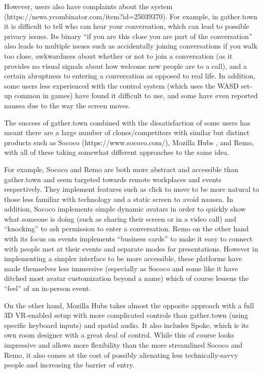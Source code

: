 \documentclass[bsc,frontabs,singlespacing,parskip,deptreport]{infthesis}
\begin{document}
However, users also have complaints about the system (https://news.ycombinator.com/item?id=25039370).  For example, in gather.town it is difficult to tell who can hear your conversation, which can lead to possible privacy issues.  Its binary “if you are this close you are part of the conversation” also leads to multiple issues such as accidentally joining conversations if you walk too close, awkwardness about whether or not to join a conversation (as it provides no visual signals about how welcome new people are to a call), and  a certain abruptness to entering a conversation as opposed to real life.  In addition, some users less experienced with the control system (which uses the WASD set-up common in games) have found it difficult to use, and some have even reported nausea due to the way the screen moves.

The success of gather.town combined with the dissatisfaction of some users has meant there are a large number of clones/competitors with similar but distinct products such as Sococo (https://www.sococo.com/), Mozilla Hubs , and Remo, with all of these taking somewhat different approaches to the same idea.

For example, Sococo and Remo are both more abstract and accessible than gather.town and seem targeted towards remote workplaces and events respectively.  They implement features such as click to move to be more natural to those less familiar with technology and a static screen to avoid nausea.  In addition, Sococo implements simple dynamic avatars in order to quickly show what someone is doing (such as sharing their screen or in a video call) and “knocking” to ask permission to enter a conversation.  Remo on the other hand with its focus on events implements “business cards” to make it easy to connect with people met at their events and separate modes for presentations.  However in implementing a simpler interface to be more accessible, these platforms have made themselves less immersive (especially as Sococo and some like it have ditched most avatar customization beyond a name) which of course lessens the “feel” of an in-person event.

On the other hand, Mozilla Hubs takes almost the opposite approach with a full 3D VR-enabled setup with more complicated controls than gather.town (using specific keyboard inputs) and spatial audio.  It also includes Spoke, which is its own room designer with a great deal of control.  While this of course looks impressive and allows more flexibility than the more streamlined Sococo and Remo, it also comes at the cost of possibly alienating less technically-savvy people and increasing the barrier of entry.
\end{document}
